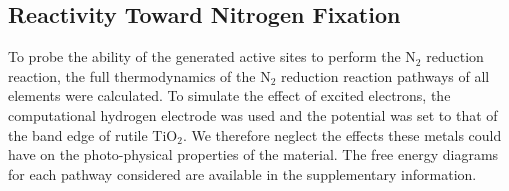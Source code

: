 



\subsection{Reactivity Toward Nitrogen Fixation}

To probe the ability of the generated active sites to perform the N$_2$ reduction reaction, the full thermodynamics of the N$_2$ reduction reaction pathways of all elements were calculated. To simulate the effect of excited electrons, the computational hydrogen electrode was used and the potential was set to that of the band edge of rutile TiO$_2$. We therefore neglect the effects these metals could have on the photo-physical properties of the material. The free energy diagrams for each pathway considered are available in the supplementary information.

